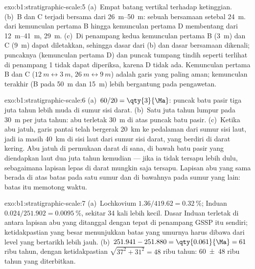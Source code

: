 \begin{solution}{exo:b1:stratigraphic-scale:5}
(a)~Empat batang vertikal terhadap ketinggian. (b)~B dan C terjadi bersama dari
\qtyrange{26}{50}{m}: sebuah  bersamaan setebal \qty{24}{m}. 
dari kemunculan pertama B hingga kemunculan pertama D membentang dari
\qtyrange{12}{41}{m}, \qty{29}{m}. (c)~Di penampang kedua kemunculan pertama B
(\qty{3}{m}) dan C (\qty{9}{m}) dapat diletakkan, sehingga dasar  dari (b)
dan dasar  bersamaan dikenali; puncaknya (kemunculan pertama D) dan puncak
tumpang tindih seperti terlihat di penampang 1 tidak dapat diperiksa, karena D tidak
ada. Kemunculan pertama B dan C ($\qty{12}{m} \leftrightarrow
\qty{3}{m}$, $\qty{26}{m} \leftrightarrow \qty{9}{m}$) adalah garis yang paling aman;
kemunculan terakhir (B pada \qty{50}{m} dan \qty{15}{m}) lebih bergantung pada pengawetan.
\end{solution}

\begin{solution}{exo:b1:stratigraphic-scale:6}
(a)~$60/20 = \qty{3}{\Ma}$: puncak batu pasir tiga juta tahun lebih muda di sumur
sisi darat. (b)~Satu juta tahun lumpur pada \qty{30}{m} per juta tahun: abu terletak
\qty{30}{m} di atas puncak batu pasir. (c)~Ketika abu jatuh, garis pantai telah bergerak
\qty{20}{km} ke pedalaman dari sumur sisi laut, jadi ia masih \qty{40}{km} di sisi laut
dari sumur sisi darat, yang berdiri di darat kering. Abu jatuh di permukaan darat di sana,
di bawah batu pasir yang diendapkan laut dua juta tahun kemudian --- jika ia tidak
tersapu lebih dulu, sebagaimana lapisan lepas di darat mungkin saja tersapu. Lapisan
abu yang sama berada di atas batas  pada satu sumur dan di bawahnya pada sumur
yang lain: batas itu memotong waktu.
\end{solution}

\begin{solution}{exo:b1:stratigraphic-scale:7}
(a)~Lochkovium $1.36/419.62 = \qty{0.32}{\%}$; Induan $0.024/251.902 =
\qty{0.0095}{\%}$, sekitar 34 kali lebih kecil. Dasar Induan terletak di antara lapisan
abu yang ditanggal dengan tepat di penampang GSSP itu sendiri; ketidakpastian yang besar
menunjukkan batas yang umurnya harus dibawa dari level yang bertarikh lebih jauh.
(b)~$251.941 - 251.880 = \qty{0.061}{\Ma} = 61$ ribu tahun, dengan ketidakpastian
$\sqrt{37^2 + 31^2} = 48$ ribu tahun: \num[uncertainty-mode=separate]{60 \pm 48} ribu
tahun yang diterbitkan.
\end{solution}

